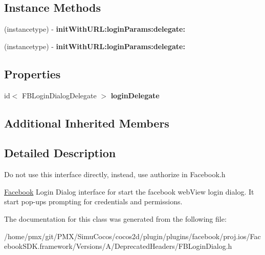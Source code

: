 \subsection*{Instance Methods}
\begin{DoxyCompactItemize}
\item 
\mbox{\label{interfaceFBLoginDialog_a2572a2ce4e96695086876765f342e876}} 
(instancetype) -\/ {\bfseries init\+With\+U\+R\+L\+:login\+Params\+:delegate\+:}
\item 
\mbox{\label{interfaceFBLoginDialog_a2572a2ce4e96695086876765f342e876}} 
(instancetype) -\/ {\bfseries init\+With\+U\+R\+L\+:login\+Params\+:delegate\+:}
\end{DoxyCompactItemize}
\subsection*{Properties}
\begin{DoxyCompactItemize}
\item 
\mbox{\label{interfaceFBLoginDialog_a967a73600d10388cfdeb876970b2e49e}} 
id$<$ F\+B\+Login\+Dialog\+Delegate $>$ {\bfseries login\+Delegate}
\end{DoxyCompactItemize}
\subsection*{Additional Inherited Members}


\subsection{Detailed Description}
Do not use this interface directly, instead, use authorize in Facebook.\+h

\hyperlink{interfaceFacebook}{Facebook} Login Dialog interface for start the facebook web\+View login dialog. It start pop-\/ups prompting for credentials and permissions. 

The documentation for this class was generated from the following file\+:\begin{DoxyCompactItemize}
\item 
/home/pmx/git/\+P\+M\+X/\+Simu\+Cocos/cocos2d/plugin/plugins/facebook/proj.\+ios/\+Facebook\+S\+D\+K.\+framework/\+Versions/\+A/\+Deprecated\+Headers/F\+B\+Login\+Dialog.\+h\end{DoxyCompactItemize}
